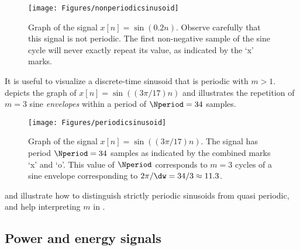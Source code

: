 \begin{figure}
	\centering
		\texttt{[image: Figures/nonperiodicsinusoid]}		
	\caption[{Graph of the signal $x[n]=\sin(0.2n)$.}]{Graph of the signal $x[n]=\sin(0.2n)$. Observe carefully that this signal is not periodic. The first non-negative sample of the sine cycle will never exactly repeat its value, as indicated by the `x' marks.\label{fig:nonperiodicsinusoid}}
\end{figure}

It is useful to visualize a discrete-time sinusoid that is periodic with $m>1$.  depicts the graph of $x[n]=\sin( (3\pi/17) n )$ and illustrates the repetition of $m=3$ sine \emph{envelopes} within a period of $\Nperiod=34$ samples.
\begin{figure}
	\centering
		\texttt{[image: Figures/periodicsinusoid]}		
	\caption[{Graph of the signal $x[n]=\sin( (3 \pi/17) n)$.}]{Graph of the signal $x[n]=\sin( (3 \pi/17) n)$. The signal has period $\Nperiod=34$ samples as indicated by the combined marks `x' and `o'. This value of $\Nperiod$ corresponds to $m=3$ cycles of a sine envelope corresponding to $2 \pi / \dw =34/3 \approx 11.3$.\label{fig:periodicsinusoid}}
\end{figure}

 and  illustrate how to distinguish strictly periodic sinusoids from quasi periodic, and help interpreting $m$ in .
\eExample



\subsection{Power and energy signals}
\label{sec:powerEnergySignals}

